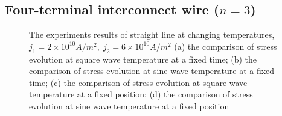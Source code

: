 \subsection{Four-terminal interconnect wire ($n=3$)}
\begin{figure}[!h]
\centering
{}
\caption{The experiments results of straight line at changing temperatures, $j_1=2\times10^{10}A/m^2,\;j_2=6\times10^{10}A/m^2$ (a) the comparison of stress evolution at square wave temperature at a fixed time; (b) the comparison of stress evolution at sine wave temperature at a fixed time; (c) the comparison of stress evolution at square wave temperature at a fixed position; (d) the comparison of stress evolution at sine wave temperature at a fixed position}
\label{fig:S3Results1}
\end{figure}


